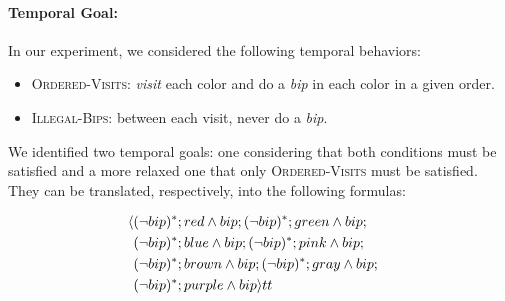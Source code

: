 \paragraph{Temporal Goal:} In our experiment, we considered the following temporal behaviors:
\begin{itemize}
	\item \textsc{Ordered-Visits}: \emph{visit} each color and do a \emph{bip} in each color in a given order.
	\item \textsc{Illegal-Bips}: between each visit, never do a \emph{bip}. 
\end{itemize}

We identified two temporal goals: one considering that both conditions must be satisfied and a more relaxed one that only \textsc{Ordered-Visits} must be satisfied. They can be translated, respectively, into the following \LDLf formulas:

\begin{align}\label{eq:sapientino-temporal-goal}
\langle &(\lnot bip)^*;red \wedge bip;(\lnot bip)^*;green \wedge bip;& \nonumber\\
&(\lnot bip)^*;blue \wedge bip;(\lnot bip)^*;pink \wedge bip;& \nonumber\\
&(\lnot bip)^*;brown \wedge bip;(\lnot bip)^*;gray \wedge bip;&\nonumber\\
&(\lnot bip)^*;purple \wedge bip \rangle tt
\end{align}

